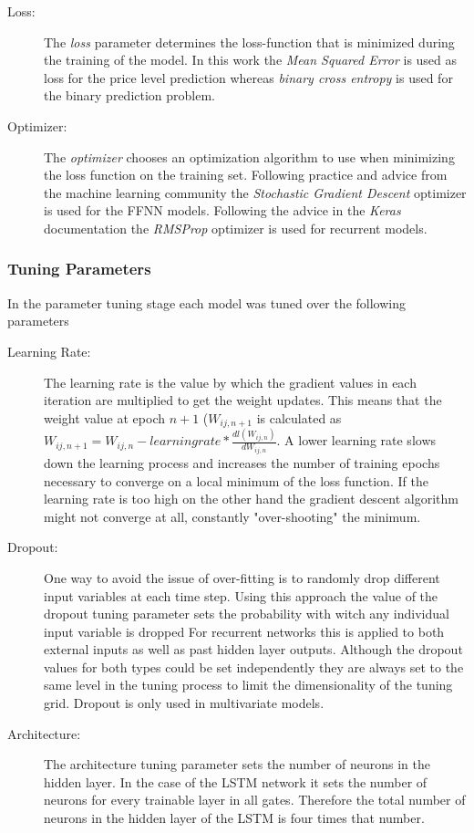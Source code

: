 \begin{description}
\item[Loss:] The \textit{loss} parameter determines the loss-function that is minimized during the training of the model. In this work the \textit{Mean Squared Error} is used as loss for the price level prediction whereas \textit{binary cross entropy} is used for the binary prediction problem.

\item[Optimizer:] The \textit{optimizer} chooses an optimization algorithm to use when minimizing the loss function on the training set. Following practice and advice from the machine learning community the \textit{Stochastic Gradient Descent} optimizer is used for the FFNN models. Following the advice in the \textit{Keras} documentation the \textit{RMSProp} optimizer is used for recurrent models.
\end{description}
\subsubsection{Tuning Parameters}
In the parameter tuning stage each model was tuned over the following parameters
\begin{description}
\item[Learning Rate:] The learning rate is the value by which the gradient values in each iteration are multiplied to get the weight updates. This means that the weight value at epoch $n+1$ ($W_{ij, n+1}$ is calculated as $W_{ij, n+1} = W_{ij, n} - learningrate * \frac{dl(W_{ij, n})}{dW_{ij, n}}$. A lower learning rate slows down the learning process and increases the number of training epochs necessary to converge on a local minimum of the loss function. If the learning rate is too high on the other hand the gradient descent algorithm might not converge at all, constantly "over-shooting" the minimum.
\item[Dropout:] One way to avoid the issue of over-fitting is to randomly drop different input variables at each time step. Using this approach the value of the dropout tuning parameter sets the probability with witch any individual input variable is dropped For recurrent networks this is applied to both external inputs as well as past hidden layer outputs. Although the dropout values for both types could be set independently they are always set to the same level in the tuning process to limit the dimensionality of the tuning grid. Dropout is only used in multivariate models.
\item[Architecture:] The architecture tuning parameter sets the number of neurons in the hidden layer. In the case of the LSTM network it sets the number of neurons for every trainable layer in all gates. Therefore the total number of neurons in the hidden layer of the LSTM is four times that number.
\end{description}
